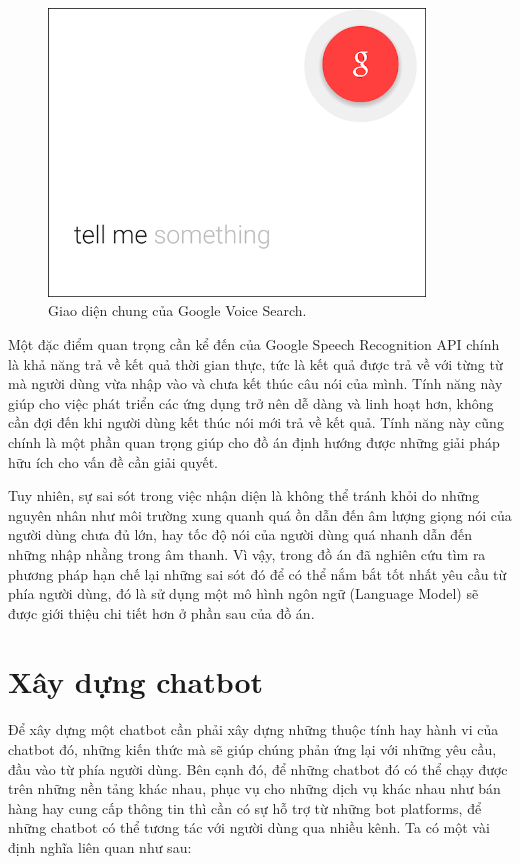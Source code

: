 \documentclass[12pt]{report}
\begin{document}
\begin{figure}[H]
  \centering
    \includegraphics[width=10cm]{Pics/Chap2/google-voice.png}
  \caption{Giao diện chung của Google Voice Search.}
\end{figure}

Một đặc điểm quan trọng cần kể đến của Google Speech Recognition API chính là khả năng trả về kết quả thời gian thực, tức là kết quả được trả về với từng từ mà người dùng vừa nhập vào và chưa kết thúc câu nói của mình. Tính năng này giúp cho việc phát triển các ứng dụng trở nên dễ dàng và linh hoạt hơn, không cần đợi đến khi người dùng kết thúc nói mới trả về kết quả. Tính năng này cũng chính là một phần quan trọng giúp cho đồ án định hướng được những giải pháp hữu ích cho vấn đề cần giải quyết.

Tuy nhiên, sự sai sót trong việc nhận diện là không thể tránh khỏi do những nguyên nhân như môi trường xung quanh quá ồn dẫn đến âm lượng giọng nói của người dùng chưa đủ lớn, hay tốc độ nói của người dùng quá nhanh dẫn đến những nhập nhằng trong âm thanh. Vì vậy, trong đồ án đã nghiên cứu tìm ra phương pháp hạn chế lại những sai sót đó để có thể nắm bắt tốt nhất yêu cầu từ phía người dùng, đó là sử dụng một mô hình ngôn ngữ (Language Model) sẽ được giới thiệu chi tiết hơn ở phần sau của đồ án.

\section{Xây dựng chatbot}

Để xây dựng một chatbot cần phải xây dựng những thuộc tính hay hành vi của chatbot đó, những kiến thức mà sẽ giúp chúng phản ứng lại với những yêu cầu, đầu vào từ phía người dùng. Bên cạnh đó, để những chatbot đó có thể chạy được trên những nền tảng khác nhau, phục vụ cho những dịch vụ khác nhau như bán hàng hay cung cấp thông tin thì cần có sự hỗ trợ từ những bot platforms, để những chatbot có thể tương tác với người dùng qua nhiều kênh. Ta có một vài định nghĩa liên quan như sau:
\end{document}
